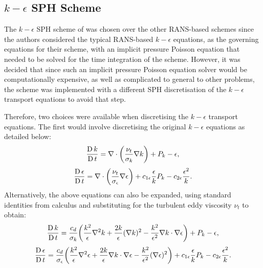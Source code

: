 \subsection[k-epsilon SPH Scheme]{$k-\epsilon$ SPH Scheme}
The $k-\epsilon$ SPH scheme of \cite{Shao2006} was chosen over the other RANS-based schemes since the authors considered the typical RANS-based $k-\epsilon$ equations, as the governing equations for their scheme, with an implicit pressure Poisson equation that needed to be solved for the time integration of the scheme.
However, it was decided that since such an implicit pressure Poisson equation solver would be computationally expensive, as well as complicated to general to other problems, the scheme was implemented with a different SPH discretisation of the $k-\epsilon$ transport equations to avoid that step.

Therefore, two choices were available when discretising the $k-\epsilon$ transport equations.
The first would involve discretising the original $k-\epsilon$ equations as detailed below:
\begin{equation}
  \frac{\operatorname{D} k}{\operatorname{D} t} = \nabla \cdot \bigg( \frac{\nu_t}{\sigma_k} \nabla k \bigg) + P_k - \epsilon,
  \label{eq:Shao2006-k-transport-eq-res-chap}
\end{equation}
\begin{equation}
  \frac{\operatorname{D} \epsilon}{\operatorname{D} t} = \nabla \cdot \bigg( \frac{\nu_t}{\sigma_{\epsilon}} \nabla \epsilon \bigg) + c_{1\epsilon} \frac{\epsilon}{k} P_k - c_{2\epsilon} \frac{\epsilon^2}{k}.
  \label{eq:Shao2006-eps-transport-eq-res-chap}
\end{equation}
Alternatively, the above equations can also be expanded, using standard identities from calculus and substituting for the turbulent eddy viscosity $\nu_t$ to obtain:
\begin{equation}
  \frac{\operatorname{D} k}{\operatorname{D} t} = \frac{c_d}{\sigma_k} \bigg( \frac{k^2}{\epsilon} \nabla^2 k + \frac{2k}{\epsilon} (\nabla k)^2 - \frac{k^2}{\epsilon^2} \nabla k \cdot \nabla \epsilon \bigg) + P_k - \epsilon,
  \label{eq:Shao2006-k-transport-eq-exp-res-chap}
\end{equation}
\begin{equation}
  \frac{\operatorname{D} \epsilon}{\operatorname{D} t} = \frac{c_d}{\sigma_\epsilon} \bigg( \frac{k^2}{\epsilon} \nabla^2 \epsilon + \frac{2k}{\epsilon} \nabla k \cdot \nabla \epsilon - \frac{k^2}{\epsilon^2} (\nabla \epsilon)^2 \bigg) + c_{1\epsilon} \frac{\epsilon}{k} P_k - c_{2\epsilon} \frac{\epsilon^2}{k}.
  \label{eq:Shao2006-eps-transport-eq-exp-res-chap}
\end{equation}

